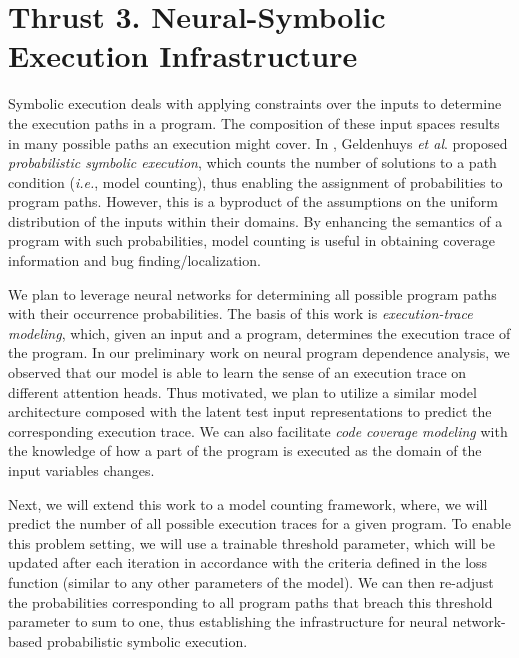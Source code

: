 \section{Thrust 3. Neural-Symbolic Execution Infrastructure}
\label{sec:thrust3}


Symbolic execution deals with applying constraints over the inputs to determine the execution paths in a program. The composition of these input spaces results in many possible paths an execution might cover. In \cite{10.1145/2338965.2336773}, Geldenhuys {\em et al}. proposed {\em probabilistic symbolic execution}, which counts the number of solutions to a path condition ({\em i.e.}, model counting), thus enabling the assignment of probabilities to program paths. However, this is a byproduct of the assumptions on the uniform distribution of the inputs within their domains. By enhancing the semantics of a program with such probabilities, model counting is useful in obtaining coverage information and bug finding/localization.

We plan to leverage neural networks for determining all possible program paths with their occurrence probabilities. The basis of this work is {\em execution-trace modeling}, which, given an input and a program, determines the execution trace of the program. In our preliminary work on neural program dependence analysis, we observed that our model is able to learn the sense of an execution trace on different attention heads. Thus motivated, we plan to utilize a similar model architecture composed with the latent test input representations to predict the corresponding execution trace. We can also facilitate {\em code coverage modeling} with the knowledge of how a part of the program is executed as the domain of the input variables changes. 

Next, we will extend this work to a model counting framework, where, we will predict the number of all possible execution traces for a given program. To enable this problem setting, we will use a trainable threshold parameter, which will be updated after each iteration in accordance with the criteria defined in the loss function (similar to any other parameters of the model). We can then re-adjust the probabilities corresponding to all program paths that breach this threshold parameter to sum to one, thus establishing the infrastructure for neural network-based probabilistic symbolic execution.  
